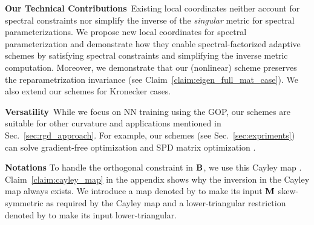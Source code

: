 {\bf Our Technical Contributions}\,
Existing local coordinates neither account for spectral constraints nor simplify the inverse of the \emph{singular} metric for spectral parameterizations.
We propose new local coordinates for spectral parameterization and demonstrate how they enable spectral-factorized adaptive schemes by satisfying spectral constraints and simplifying the inverse metric computation.
Moreover, we demonstrate that our (nonlinear) scheme preserves the reparametrization invariance (see Claim~\ref{claim:eigen_full_mat_case}).
We also extend our schemes for Kronecker cases.

{\bf Versatility}\,
While we focus on NN training using the GOP, our schemes are suitable for other curvature and applications mentioned in Sec.~\ref{sec:rgd_approach}. For example, our schemes (see  Sec.~\ref{sec:expriments}) can solve gradient-free optimization \citep{wierstra2008natural} and SPD matrix optimization \citep{absil2009optimization}.


\vspace{-0.05cm}
{\bf Notations}
To handle the orthogonal constraint in $\mbox{$\mbox{$\mathbf{B}$}$}$, we use this Cayley map .
Claim~\ref{claim:cayley_map} in the appendix shows why the inversion in the Cayley map always exists.
%
We introduce a map denoted by  to make its input $\mbox{$\mbox{$\mathbf{M}$}$}$ skew-symmetric as required by the Cayley map and a lower-triangular restriction denoted by  to make its input lower-triangular.



